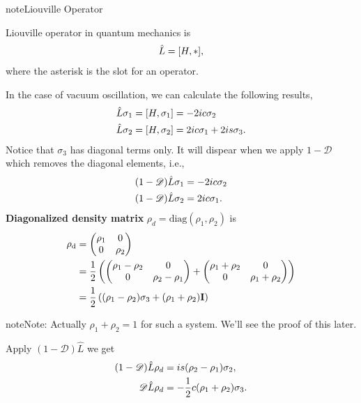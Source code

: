 \documentclass[letterpaper,12pt,english]{sphinxmanual}
\begin{document}
\begin{notice}{note}{Liouville Operator}

Liouville operator in quantum mechanics is
\begin{gather}
\begin{split}\hat L  =  [H, *],\end{split}\notag
\end{gather}
where the asterisk is the slot for an operator.

In the case of vacuum oscillation, we can calculate the following results,
\begin{gather}
\begin{split}\hat L \sigma_1 &= [H, \sigma_1] = -2ic\sigma_2 \\
\hat L \sigma_2 &= [H, \sigma_2] = 2ic\sigma_1 + 2is\sigma_3.\end{split}\notag
\end{gather}
Notice that \(\sigma_3\) has diagonal terms only. It will dispear when we apply \(1-\mathscr D\) which removes the diagonal elements, i.e.,
\begin{gather}
\begin{split}(1-\mathscr D)\hat L \sigma_1 &= -2ic\sigma_2 \\
(1-\mathscr D)\hat L \sigma_2 &= 2ic\sigma_1.\end{split}\notag
\end{gather}
\textbf{Diagonalized density matrix} \(\rho_d=\mathrm {diag}(\rho_1,\rho_2)\) is
\begin{gather}
\begin{split}\mathrm {\rho_d} &= \begin{pmatrix} \rho_1 & 0 \\ 0 & \rho_2 \end{pmatrix} \\
& = \frac{1}{2} \left(\begin{pmatrix} \rho_1 -\rho_2 & 0 \\ 0 & \rho_2 -\rho_1 \end{pmatrix} + \begin{pmatrix} \rho_1+\rho_2 & 0 \\ 0 & \rho_1 + \rho_2 \end{pmatrix} \right) \\
& = \frac{1}{2}\left( (\rho_1-\rho_2)\sigma_3 + (\rho_1+\rho_2)\mathbf I \right)\end{split}\notag
\end{gather}
\begin{notice}{note}{Note:}
Actually \(\rho_1+\rho_2=1\) for such a system. We'll see the proof of this later.
\end{notice}

Apply \((1-\mathscr D)\hat L\) we get
\begin{gather}
\begin{split}(1-\mathscr D)\hat L \rho_d &= i s (\rho_2-\rho_1) \sigma_2,\\
\mathscr D \hat L \rho_d & = -\frac{1}{2}c (\rho_1+\rho_2)\sigma_3.\end{split}\notag
\end{gather}\end{notice}
\end{document}
